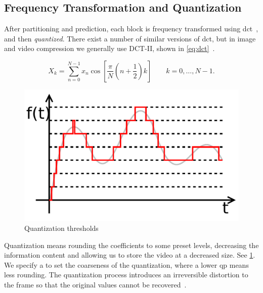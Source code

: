 

\subsection{Frequency Transformation and Quantization}
\label{subsec:quantization}
After partitioning and prediction, each block is frequency transformed using \gls{dct}~\cite{Sauer}, and then \textit{quantized}. There exist a number of similar versions of \gls{dct}, but in image and video compression we generally use DCT-II, shown in \cref{eq:dct}~\cite{Flierl}.


\begin{equation}
\label{eq:dct}
X_k = \sum_{n=0}^{N-1} x_n \cos \left[\frac{\pi}{N} \left(n+\frac{1}{2}\right) k \right] \quad \quad k = 0, \dots, N-1.
\end{equation}

\begin{figure}
    \centering
    \includegraphics[scale=0.55]{pictures/wikipedia/public-domain/quantized-signal.pdf}
    \caption{Quantization thresholds}
    \label{fig:quantization-thresholds}
\end{figure}

Quantization means rounding the coefficients to some preset levels, decreasing the information content and allowing us to store the video at a decreased size. See \cref{fig:quantization-thresholds}. We specify a  to set the coarseness of the quantization, where a lower \gls{qp} means less rounding. The quantization process introduces an irreversible distortion to the frame so that the original values cannot be recovered~\cite{Wien_Coding_Tools}.

